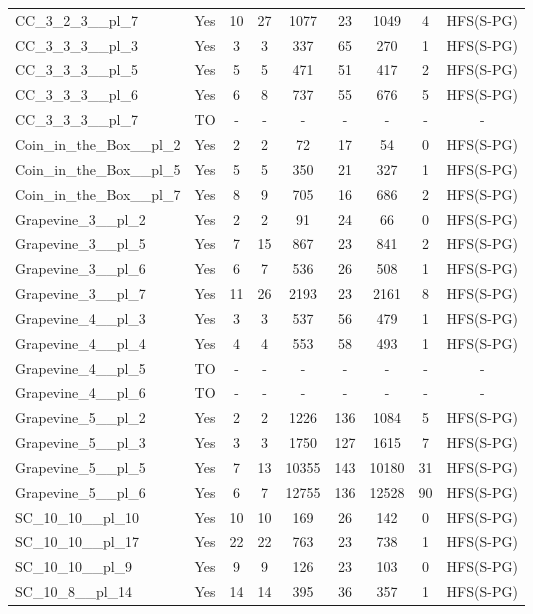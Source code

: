\documentclass{article}
\begin{document}
\begin{tabular}{lcccccccc}
CC\_3\_2\_3\_\_pl\_7 & Yes & 10 & 27 & 1077 & 23 & 1049 & 4 & HFS(S-PG) \\
CC\_3\_3\_3\_\_pl\_3 & Yes & 3 & 3 & 337 & 65 & 270 & 1 & HFS(S-PG) \\
CC\_3\_3\_3\_\_pl\_5 & Yes & 5 & 5 & 471 & 51 & 417 & 2 & HFS(S-PG) \\
CC\_3\_3\_3\_\_pl\_6 & Yes & 6 & 8 & 737 & 55 & 676 & 5 & HFS(S-PG) \\
CC\_3\_3\_3\_\_pl\_7 & TO & - & - & - & - & - & - & - \\
Coin\_in\_the\_Box\_\_pl\_2 & Yes & 2 & 2 & 72 & 17 & 54 & 0 & HFS(S-PG) \\
Coin\_in\_the\_Box\_\_pl\_5 & Yes & 5 & 5 & 350 & 21 & 327 & 1 & HFS(S-PG) \\
Coin\_in\_the\_Box\_\_pl\_7 & Yes & 8 & 9 & 705 & 16 & 686 & 2 & HFS(S-PG) \\
Grapevine\_3\_\_pl\_2 & Yes & 2 & 2 & 91 & 24 & 66 & 0 & HFS(S-PG) \\
Grapevine\_3\_\_pl\_5 & Yes & 7 & 15 & 867 & 23 & 841 & 2 & HFS(S-PG) \\
Grapevine\_3\_\_pl\_6 & Yes & 6 & 7 & 536 & 26 & 508 & 1 & HFS(S-PG) \\
Grapevine\_3\_\_pl\_7 & Yes & 11 & 26 & 2193 & 23 & 2161 & 8 & HFS(S-PG) \\
Grapevine\_4\_\_pl\_3 & Yes & 3 & 3 & 537 & 56 & 479 & 1 & HFS(S-PG) \\
Grapevine\_4\_\_pl\_4 & Yes & 4 & 4 & 553 & 58 & 493 & 1 & HFS(S-PG) \\
Grapevine\_4\_\_pl\_5 & TO & - & - & - & - & - & - & - \\
Grapevine\_4\_\_pl\_6 & TO & - & - & - & - & - & - & - \\
Grapevine\_5\_\_pl\_2 & Yes & 2 & 2 & 1226 & 136 & 1084 & 5 & HFS(S-PG) \\
Grapevine\_5\_\_pl\_3 & Yes & 3 & 3 & 1750 & 127 & 1615 & 7 & HFS(S-PG) \\
Grapevine\_5\_\_pl\_5 & Yes & 7 & 13 & 10355 & 143 & 10180 & 31 & HFS(S-PG) \\
Grapevine\_5\_\_pl\_6 & Yes & 6 & 7 & 12755 & 136 & 12528 & 90 & HFS(S-PG) \\
SC\_10\_10\_\_pl\_10 & Yes & 10 & 10 & 169 & 26 & 142 & 0 & HFS(S-PG) \\
SC\_10\_10\_\_pl\_17 & Yes & 22 & 22 & 763 & 23 & 738 & 1 & HFS(S-PG) \\
SC\_10\_10\_\_pl\_9 & Yes & 9 & 9 & 126 & 23 & 103 & 0 & HFS(S-PG) \\
SC\_10\_8\_\_pl\_14 & Yes & 14 & 14 & 395 & 36 & 357 & 1 & HFS(S-PG) \\

\end{tabular}
\end{document}
